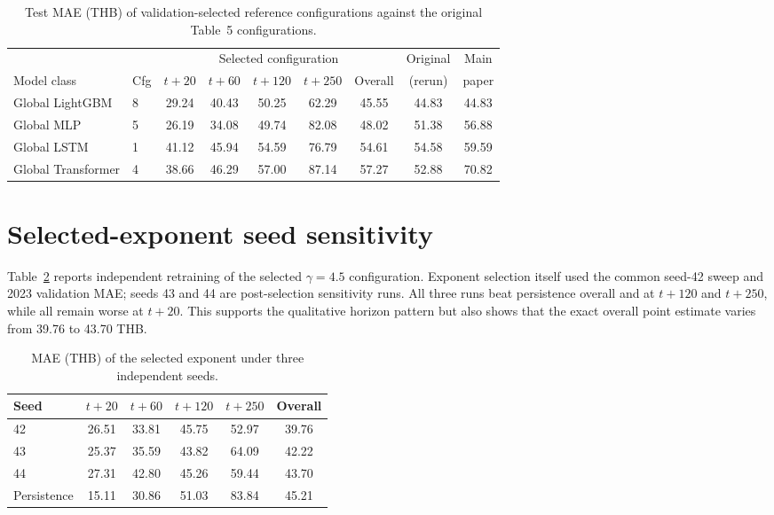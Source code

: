 \documentclass[11pt]{article}
\begin{document}
\begin{table}[htbp]\centering
\caption{Test MAE (THB) of validation-selected reference configurations against the original Table~5 configurations.}
\label{tab:impact}
\small
\begin{tabular}{llccccccc}
\toprule
 & & \multicolumn{5}{c}{Selected configuration} & Original & Main \\
Model class & Cfg & $t{+}20$ & $t{+}60$ & $t{+}120$ & $t{+}250$ & Overall & (rerun) & paper \\
\midrule
Global LightGBM & 8 & 29.24 & 40.43 & 50.25 & 62.29 & 45.55 & 44.83 & 44.83 \\
Global MLP & 5 & 26.19 & 34.08 & 49.74 & 82.08 & 48.02 & 51.38 & 56.88 \\
Global LSTM & 1 & 41.12 & 45.94 & 54.59 & 76.79 & 54.61 & 54.58 & 59.59 \\
Global Transformer & 4 & 38.66 & 46.29 & 57.00 & 87.14 & 57.27 & 52.88 & 70.82 \\
\bottomrule
\end{tabular}
\end{table}

\section{Selected-exponent seed sensitivity}
Table~\ref{tab:seeds} reports independent retraining of the selected $\gamma=4.5$ configuration. Exponent selection itself used the common seed-42 sweep and 2023 validation MAE; seeds 43 and 44 are post-selection sensitivity runs. All three runs beat persistence overall and at $t{+}120$ and $t{+}250$, while all remain worse at $t{+}20$. This supports the qualitative horizon pattern but also shows that the exact overall point estimate varies from 39.76 to 43.70 THB.

\begin{table}[htbp]\centering
\caption{MAE (THB) of the selected exponent under three independent seeds.}
\label{tab:seeds}
\small
\begin{tabular}{lccccc}
\toprule
Seed & $t{+}20$ & $t{+}60$ & $t{+}120$ & $t{+}250$ & Overall \\
\midrule
42 & 26.51 & 33.81 & 45.75 & 52.97 & 39.76 \\
43 & 25.37 & 35.59 & 43.82 & 64.09 & 42.22 \\
44 & 27.31 & 42.80 & 45.26 & 59.44 & 43.70 \\
Persistence & 15.11 & 30.86 & 51.03 & 83.84 & 45.21 \\
\bottomrule
\end{tabular}
\end{table}
\end{document}
